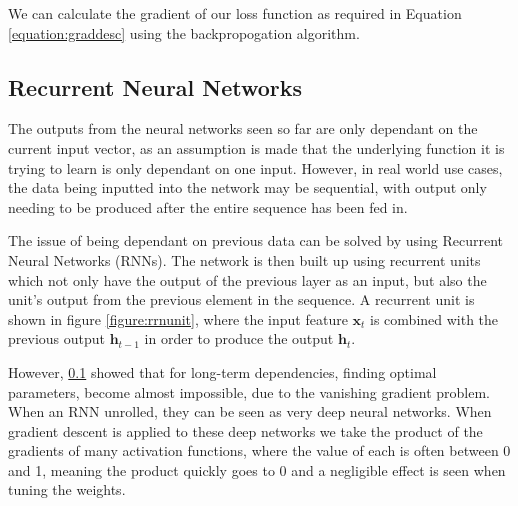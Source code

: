 \documentclass[12pt,a4paper,twoside,openright]{report}
\begin{document}
We can calculate the gradient of our loss function as required in Equation \ref{equation:graddesc} using the backpropogation algorithm.

\subsection{Recurrent Neural Networks}

The outputs from the neural networks seen so far are only dependant on the current input vector, as an assumption is made that the underlying function it is trying to learn is only dependant on one input. However, in real world use cases, the data being inputted into the network may be sequential, with output only needing to be produced after the entire sequence has been fed in. 
\newline
 
The issue of being dependant on previous data can be solved by using Recurrent Neural Networks (RNNs). The network is then built up using recurrent units which not only have the output of the previous layer as an input, but also the unit's output from the previous element in the sequence. A recurrent unit is shown in figure \ref{figure:rrnunit}, where the input feature $\mathbf{x}_t$ is combined with the previous output $\mathbf{h}_{t-1}$ in order to produce the output $\mathbf{h}_t$.
\newline
 
However, \ref{} showed that for long-term dependencies, finding optimal parameters, become almost impossible, due to the vanishing gradient problem. When an RNN unrolled, they can be seen as very deep neural networks. When gradient descent is applied to these deep networks we take   the product of the gradients of many activation functions, where the value of each is often between 0 and 1, meaning the product quickly goes to 0 and a negligible effect is seen when tuning the weights.
\end{document}
